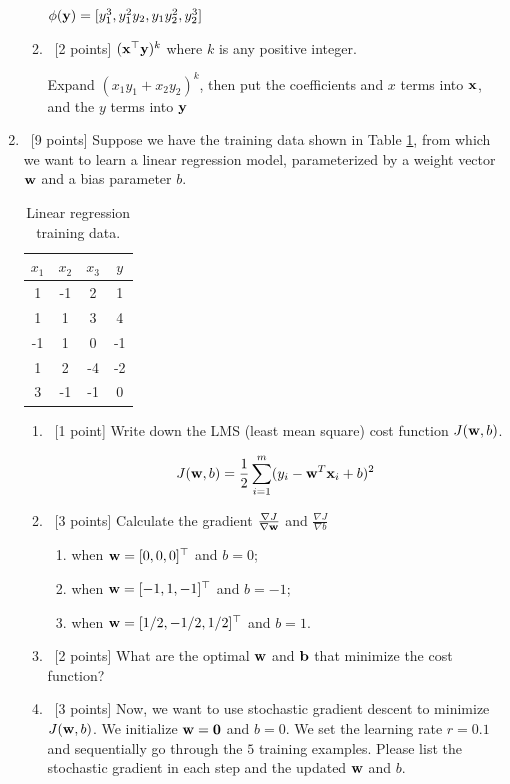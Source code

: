 \documentclass[12pt, fullpage,letterpaper]{article}
\begin{document}
\begin{enumerate}
\begin{enumerate}
		$\phi({\bf y}) = [y_1^3, y_1^2y_2, y_1y_2^2, y_2^3]$
		\item~[2 points] $({\bf x}^\top {\bf y})^k$ where $k$ is  any positive integer.
		
		Expand $(x_1y_1 + x_2y_2)^k$, then put the coefficients and $x$ terms into ${\bf x}$, and the $y$ terms into ${\bf y}$
	\end{enumerate}

\item~[9 points] Suppose we have the training data shown in Table \ref{tb:1}, from which we want to learn a linear regression model, parameterized by a weight vector ${\bf w}$ and a bias parameter $b$.  
\begin{table}
	\centering
	\begin{tabular}{ccc|c}
		$x_1 $ & $x_2$ & $x_3$ &  $y$\\ 
		\hline\hline
		1 & -1 & 2 & 1 \\ \hline
		1 & 1 & 3 & 4 \\ \hline
		-1 & 1 & 0 & -1 \\ \hline
		1 & 2 & -4 & -2 \\ \hline
		3 & -1 & -1 & 0\\ \hline
	\end{tabular}
	\caption{Linear regression training data.}
	\label{tb:1}
\end{table}

\begin{enumerate}
	\item~[1 point] Write down the LMS (least mean square) cost function $J({\bf w}, b)$. 
	
	$$J({\bf w}, b) = \frac{1}{2} \sum_{i=1}^{m}(y_i - {\bf w}^T{\bf x}_i + b)^2$$
	\bigskip
	\item~[3 points] Calculate the gradient $\frac{\nabla J}{\nabla {\bf w}}$ and $\frac{\nabla J}{\nabla b}$ 
	\begin{enumerate}
		\item when ${\bf w} = [0,0,0]^\top$ and $b = 0$;
		\item when ${\bf w} = [-1,1,-1]^\top$ and $b = -1$;
		\item when ${\bf w} = [1/2,-1/2,1/2]^\top$ and $b = 1$.
	\end{enumerate}
	\item~[2 points] What are the optimal ${\bf w}$ and ${\bf b}$ that minimize the cost function? 
	\item~[3 points] Now, we want to use stochastic gradient descent to minimize $J({\bf w}, b)$. We initialize ${\bf w} = {\bf 0}$ and $b = 0$. We set the learning rate $r = 0.1$ and sequentially go through the $5$ training examples. Please list the stochastic gradient in each step and the updated ${\bf w}$ and $b$.  
\end{enumerate}
\end{enumerate}
\end{document}
